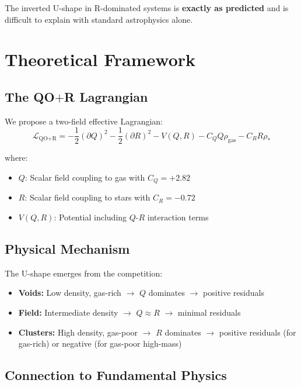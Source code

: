 \documentclass[12pt,a4paper]{article}
\newcommand{\QOR}{QO$+$R}
\newcommand{\Lqor}{\mathcal{L}_{\text{QO}+\text{R}}}
\begin{document}
The inverted U-shape in R-dominated systems is \textbf{exactly as predicted} and is difficult to explain with standard astrophysics alone.

\section{Theoretical Framework}
\label{sec:theory}

\subsection{The \QOR{} Lagrangian}

We propose a two-field effective Lagrangian:
\begin{equation}
\Lqor = -\frac{1}{2}(\partial Q)^2 - \frac{1}{2}(\partial R)^2 - V(Q,R) - C_Q Q \rho_{\text{gas}} - C_R R \rho_*
\label{eq:lagrangian}
\end{equation}

where:
\begin{itemize}
    \item $Q$: Scalar field coupling to gas with $C_Q = +2.82$
    \item $R$: Scalar field coupling to stars with $C_R = -0.72$
    \item $V(Q,R)$: Potential including $Q$-$R$ interaction terms
\end{itemize}

\subsection{Physical Mechanism}

The U-shape emerges from the competition:
\begin{itemize}
    \item \textbf{Voids:} Low density, gas-rich $\rightarrow$ $Q$ dominates $\rightarrow$ positive residuals
    \item \textbf{Field:} Intermediate density $\rightarrow$ $Q \approx R$ $\rightarrow$ minimal residuals
    \item \textbf{Clusters:} High density, gas-poor $\rightarrow$ $R$ dominates $\rightarrow$ positive residuals (for gas-rich) or negative (for gas-poor high-mass)
\end{itemize}

\subsection{Connection to Fundamental Physics}
\end{document}
